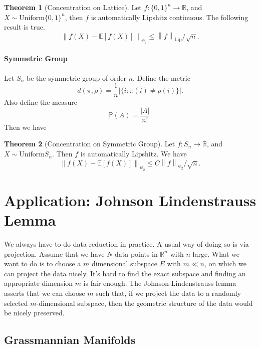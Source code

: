\documentclass[9pt,onesided]{article}
\newcommand{\nm}[1]{\left\lVert#1\right\rVert}
\newcommand{\re}{\mathbb{R}}
\newcommand{\ex}[1]{\mathbb{E}[#1]}
\newcommand{\mc}{\color{BlueViolet}}
\renewcommand{\le}{\leqslant}
\newcommand{\p}{\mathbb{P}}
\theoremstyle{definition}
\newtheorem{theorem}{\mc Theorem}
\begin{document}
\begin{theorem}
    [Concentration on Lattice]Let $f:\{0,1\}^n\to \re$, and $X\sim \mathrm{Uniform}\{0,1\}^n$, then $f$ is automatically Lipshitz continuous. The following result is true.
    \begin{equation*}
        \nm{f(X)-\ex{f(X)}}_{\psi_2}\le \nm{f}_{\mathrm{Lip}}/\sqrt{n}.
    \end{equation*}
\end{theorem}

\paragraph{Symmetric Group} Let $S_n$ be the symmetric group of order $n$. Define the metric
\begin{equation*}
     d(\pi,\rho)= \frac{1}{n} |\{i:\pi(i)\neq \rho(i)\}|.
\end{equation*}
Also define the measure
\begin{equation*}
    \p(A)=\frac{ |A|}{n!}.
\end{equation*}
 Then we have
\begin{theorem}
    [Concentration on Symmetric Group] Let $f:S_n\to 
    \re$, and $X \sim \mathrm{Uniform}S_n$. Then $f$ is automatically Lipshitz. We have 
    \begin{equation*}
         \nm{f(X)-\ex{f(X)}}_{\psi_2}\le C \nm{f}_{\psi_2}/\sqrt{n}.
    \end{equation*}
\end{theorem}
    
\section{Application: Johnson Lindenstrauss Lemma}

We always have to do data reduction in practice. A usual way of doing so is via projection. Assume that we have $N$ data points in $\re^n$ with $n$ large. What we want to do is to choose a $m$ dimensional subspace $E$ with $m\ll n$, on which we can project the data nicely. It's hard to find the exact subspace and finding an appropriate dimension $m$ is fair enough. The Johnson-Lindenstrauss lemma asserts that we can choose $m$ such that, if we project the data to a randomly selected $m$-dimensional subspace, then the geometric structure of the data would be nicely preserved.

\subsection{Grassmannian Manifolds}
\end{document}
